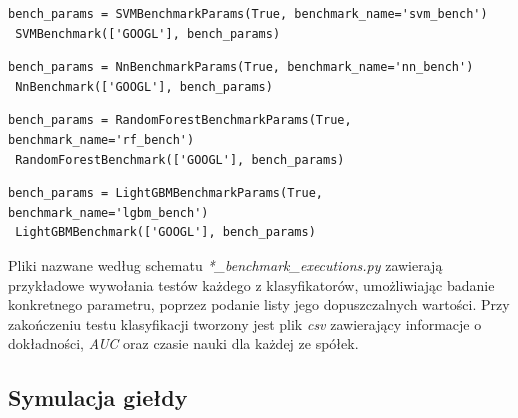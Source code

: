 \documentclass[a4paper, twoside, 11pt, openright]{article}
\begin{document}
\begin{lstlisting}[caption={Przykładowe wywołanie testu dla modelu \textit{SVM} (plik \textit{svm\_benchmark.py}).}, label={code:svm},frame=single, captionpos=b, mathescape=true]
 bench_params = SVMBenchmarkParams(True, benchmark_name='svm_bench')
 SVMBenchmark(['GOOGL'], bench_params)
\end{lstlisting}

\begin{lstlisting}[caption={Przykładowe wywołanie testu dla modelu sieci neuronowej (plik \textit{nn\_benchmark.py}).}, label={code:mlp},frame=single, captionpos=b, mathescape=true]
 bench_params = NnBenchmarkParams(True, benchmark_name='nn_bench')
 NnBenchmark(['GOOGL'], bench_params)
\end{lstlisting}

\begin{lstlisting}[caption={Przykładowe wywołanie testu dla modelu lasu losowego (plik \textit{rf\_benchmark.py}).}, label={code:rf},frame=single, captionpos=b, mathescape=true]
 bench_params = RandomForestBenchmarkParams(True, benchmark_name='rf_bench')
 RandomForestBenchmark(['GOOGL'], bench_params)
\end{lstlisting}

\begin{lstlisting}[caption={Przykładowe wywołanie testu dla modelu \textit{Light GBM} (plik \textit{lgbm\_benchmark.py}).}, label={code:lgbm},frame=single, captionpos=b, mathescape=true]
 bench_params = LightGBMBenchmarkParams(True, benchmark_name='lgbm_bench')
 LightGBMBenchmark(['GOOGL'], bench_params)
\end{lstlisting}

 Pliki nazwane według schematu \textit{*\_benchmark\_executions.py} zawierają przykładowe wywołania testów każdego z klasyfikatorów, umożliwiając badanie konkretnego parametru, poprzez podanie listy jego dopuszczalnych wartości. Przy zakończeniu testu klasyfikacji tworzony jest plik \textit{csv} zawierający informacje o dokładności, \textit{AUC} oraz czasie nauki dla każdej ze spółek.

\subsection*{Symulacja giełdy}
\end{document}
